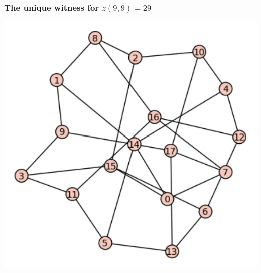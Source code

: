 \documentclass[pdf,hyperref={urlbordercolor={0 1 1}},xcolor=pdftex,dvipsnames]{beamer}
\begin{document}
\begin{frame}
  \frametitle{The unique witness for $z(9,9)=29$}
  \begin{center}
    \begin{minipage}[c]{.47\textwidth}
      \includegraphics[scale=.5]{figs/b18z29.pdf}
    \end{minipage}
    \begin{minipage}[c]{.47\textwidth}
      \begin{center}
        {
          \begin{tikzpicture}
            
          \end{tikzpicture}
        }
      \end{center}
    \end{minipage}
  \end{center}
\end{frame}
\end{document}
